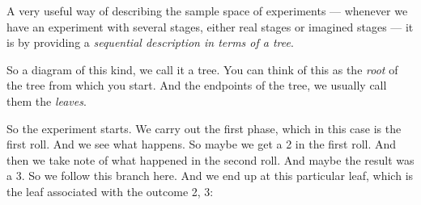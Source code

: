 \documentclass[pdftex, brazil, 12pt, twoside]{article}
\begin{document}
A very useful way of describing the sample space of
experiments ---
whenever we have an experiment with several stages, either
real stages or imagined stages --- it is by providing
a \emph{sequential description in terms of a tree}.

\begin{figure}[H]
  \begin{center}
  \end{center}
\end{figure}

So a diagram of this kind, we call it a tree.
You can think of this as the \emph{root} of the tree
from which you start.
And the endpoints of the tree, we usually
call them the \emph{leaves}.

So the experiment starts.
We carry out the first phase, which in this case is the
first roll.
And we see what happens.
So maybe we get a 2 in the first roll.
And then we take note of what happened in the second roll.
And maybe the result was a 3.
So we follow this branch here.
And we end up at this particular leaf, which is the
leaf associated with the outcome 2, 3:

\begin{figure}[H]
  \begin{center}
  \end{center}
\end{figure}
\end{document}
